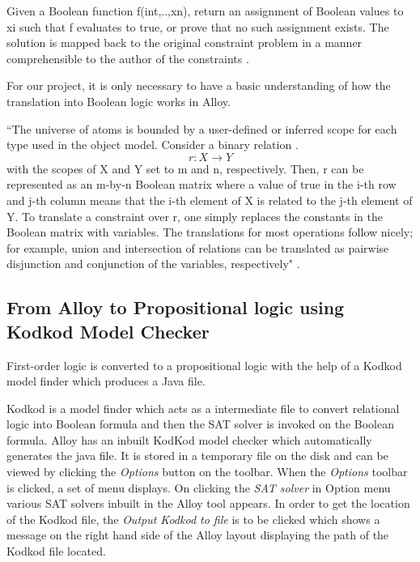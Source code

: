 \documentclass[a4paper,12pt]{report}
\begin{document}
\begin{onehalfspacing}
Given a Boolean function f(int,..,xn), return an assignment of Boolean values to xi such that f evaluates to true, or prove that no such assignment exists. The solution is mapped back to the original constraint problem in a manner comprehensible to the author of the constraints \cite{Yeung2005}.

For our project, it is only necessary to have a basic understanding of how the translation into Boolean logic works in Alloy. 
 
``The universe of atoms is bounded by a user-defined or inferred scope for each type used in the object model. Consider a binary relation .
\begin{equation}
r : X \rightarrow Y
\end{equation} 
with the scopes of X and Y set to m and n, respectively. Then, r can be represented as an m-by-n Boolean matrix where a value of true in the i-th row and j-th column means that the i-th element of X is related to the j-th element of Y. To translate a constraint over r, one simply replaces the constants in the Boolean matrix with variables. The translations for most operations follow nicely; for example, union and intersection of relations can be translated as pairwise disjunction and conjunction of the variables, respectively" \cite{Yeung2005}.

\subsection{From Alloy to Propositional logic using Kodkod Model Checker}
\label{Kodkod model checker}
First-order logic is converted to a propositional logic with the help of a Kodkod model finder which produces a Java file. 

Kodkod is a model finder which acts as a intermediate file to convert relational logic into Boolean formula and then the SAT solver is invoked on the Boolean formula. Alloy has an inbuilt KodKod model checker which automatically generates the java file. It is stored in a temporary file on the disk and can be viewed by clicking the \textit{Options} button on the toolbar. When the \textit{Options} toolbar is clicked, a set of menu displays. On clicking the \textit{SAT solver} in Option menu various SAT solvers inbuilt in the Alloy tool appears. In order to get the location of the Kodkod file, the \textit{Output Kodkod to file} is to be clicked which shows a message on the right hand side of the Alloy layout displaying the path of the Kodkod file located.


\end{onehalfspacing}
\end{document}
